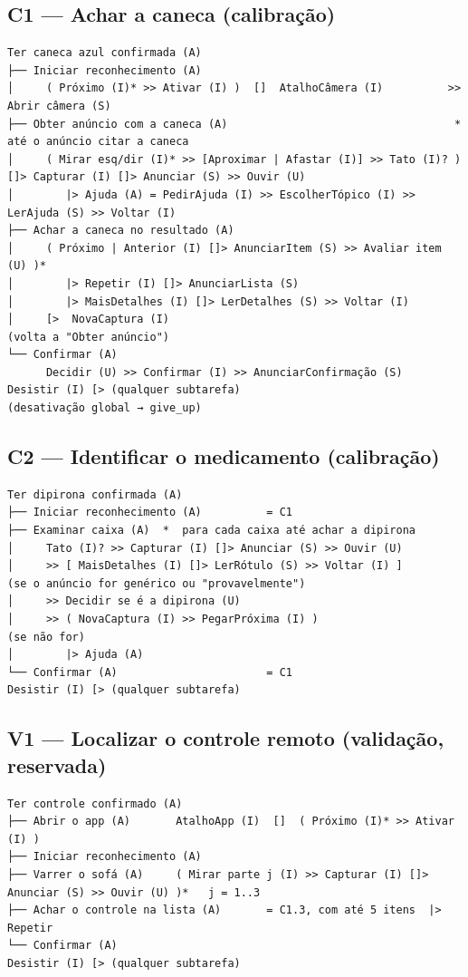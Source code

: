 \documentclass[a4paper,10pt]{article}
\begin{document}
\subsection*{C1 — Achar a caneca (calibração)}
\begin{Verbatim}[fontsize=\footnotesize,frame=single]
Ter caneca azul confirmada (A)
├── Iniciar reconhecimento (A)
│     ( Próximo (I)* >> Ativar (I) )  []  AtalhoCâmera (I)          >>  Abrir câmera (S)
├── Obter anúncio com a caneca (A)                                   *  até o anúncio citar a caneca
│     ( Mirar esq/dir (I)* >> [Aproximar | Afastar (I)] >> Tato (I)? ) []> Capturar (I) []> Anunciar (S) >> Ouvir (U)
│        |> Ajuda (A) = PedirAjuda (I) >> EscolherTópico (I) >> LerAjuda (S) >> Voltar (I)
├── Achar a caneca no resultado (A)
│     ( Próximo | Anterior (I) []> AnunciarItem (S) >> Avaliar item (U) )*
│        |> Repetir (I) []> AnunciarLista (S)
│        |> MaisDetalhes (I) []> LerDetalhes (S) >> Voltar (I)
│     [>  NovaCaptura (I)                                             (volta a "Obter anúncio")
└── Confirmar (A)
      Decidir (U) >> Confirmar (I) >> AnunciarConfirmação (S)
Desistir (I) [> (qualquer subtarefa)                                  (desativação global → give_up)
\end{Verbatim}

\subsection*{C2 — Identificar o medicamento (calibração)}
\begin{Verbatim}[fontsize=\footnotesize,frame=single]
Ter dipirona confirmada (A)
├── Iniciar reconhecimento (A)          = C1
├── Examinar caixa (A)  *  para cada caixa até achar a dipirona
│     Tato (I)? >> Capturar (I) []> Anunciar (S) >> Ouvir (U)
│     >> [ MaisDetalhes (I) []> LerRótulo (S) >> Voltar (I) ]          (se o anúncio for genérico ou "provavelmente")
│     >> Decidir se é a dipirona (U)
│     >> ( NovaCaptura (I) >> PegarPróxima (I) )                         (se não for)
│        |> Ajuda (A)
└── Confirmar (A)                       = C1
Desistir (I) [> (qualquer subtarefa)
\end{Verbatim}

\subsection*{V1 — Localizar o controle remoto (validação, reservada)}
\begin{Verbatim}[fontsize=\footnotesize,frame=single]
Ter controle confirmado (A)
├── Abrir o app (A)       AtalhoApp (I)  []  ( Próximo (I)* >> Ativar (I) )
├── Iniciar reconhecimento (A)
├── Varrer o sofá (A)     ( Mirar parte j (I) >> Capturar (I) []> Anunciar (S) >> Ouvir (U) )*   j = 1..3
├── Achar o controle na lista (A)       = C1.3, com até 5 itens  |> Repetir
└── Confirmar (A)
Desistir (I) [> (qualquer subtarefa)
\end{Verbatim}
\end{document}

